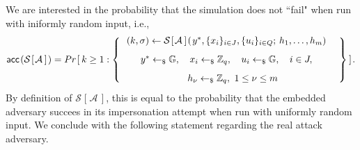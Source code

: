 \documentclass[psamsfonts, reqno]{amsart}
\theoremstyle{definition}
\theoremstyle{remark}
\numberwithin{equation}{section}
\begin{document}
\noindent
We are interested in the probability that the simulation
does not ``fail" when run with iniformly random input, i.e.,
\vspace{8pt}
\begin{equation*}
\mathsf{acc}\hspace{1pt}(
	\mathcal{S}\hspace{1pt}
	[\hspace{1pt}
		\mathcal{A}
	\hspace{2pt}]
	\hspace{1pt}) =
Pr\hspace{1pt}[\hspace{2pt}k \ge 1 :
\begin{Bmatrix}
\ \ (k, \sigma) \leftarrow
\mathcal{S}\hspace{1pt}
	[\hspace{1pt}
		\mathcal{A}
	\hspace{2pt}]
\hspace{1pt}
(
	\hspace{1pt}
	y^*,
	\{x_i\}_{i \in J},
	\{u_i\}_{i \in Q};
	\hspace{2pt} h_1, \dots, h_m
)\ \ \ \ \\[8pt]
\ y^* \leftarrow_\$ \mathbb{G},
\ \ \ x_i \leftarrow_\$ \mathbb{Z}_q,
\ \ \ u_i \leftarrow_\$ \mathbb{G},
\ \ \ i \in J,\ \ \ \\[8pt]
\ \ h_\nu \leftarrow_\$ \mathbb{Z}_q,\ 1 \le \nu \le m
\end{Bmatrix}
\hspace{2pt}]\hspace{1pt}.
\vspace{8pt}
\end{equation*}
By definition of
$\mathcal{S}\hspace{1pt}[\hspace{1pt}\mathcal{A}\hspace{2pt}]$,
this is equal to the probability that the embedded
adversary succees in its impersonation
attempt when run with uniformly random input.
We conclude with the following statement regarding the
real attack adversary.
\end{document}
